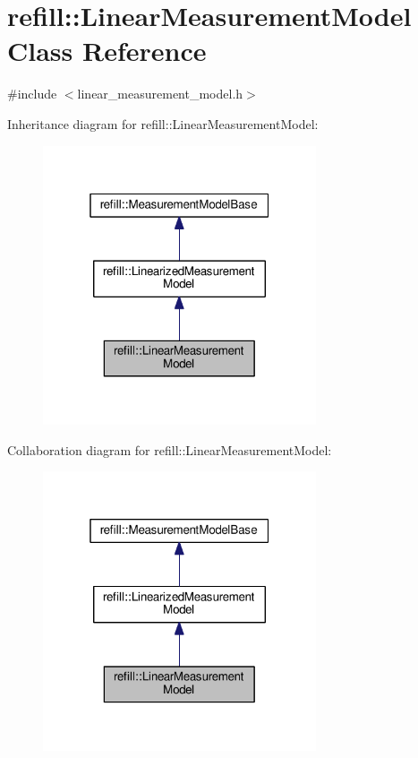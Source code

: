 \hypertarget{classrefill_1_1LinearMeasurementModel}{}\section{refill\+:\+:Linear\+Measurement\+Model Class Reference}
\label{classrefill_1_1LinearMeasurementModel}


{\ttfamily \#include $<$linear\+\_\+measurement\+\_\+model.\+h$>$}



Inheritance diagram for refill\+:\+:Linear\+Measurement\+Model\+:\nopagebreak
\begin{figure}[H]
\begin{center}
\leavevmode
\includegraphics[width=229pt]{classrefill_1_1LinearMeasurementModel__inherit__graph}
\end{center}
\end{figure}


Collaboration diagram for refill\+:\+:Linear\+Measurement\+Model\+:\nopagebreak
\begin{figure}[H]
\begin{center}
\leavevmode
\includegraphics[width=229pt]{classrefill_1_1LinearMeasurementModel__coll__graph}
\end{center}
\end{figure}
